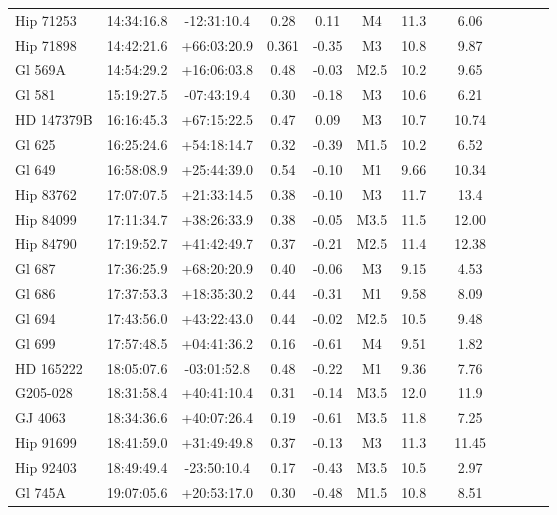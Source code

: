 \begin{landscape}
{\begin{longtable}{l|cccccccccccc}
  Hip 71253 & 14:34:16.8 & -12:31:10.4 & 0.28 & 0.11 & M4 &  11.3 & \citet{Koen10} &  6.06 \\ 
  Hip 71898 & 14:42:21.6 & +66:03:20.9 & 0.361 & -0.35 & M3 & 10.8 & \citet{Hog00} &  9.87  \\ 
  Gl 569A & 14:54:29.2 & +16:06:03.8 & 0.48 & -0.03 & M2.5 & 10.2 & \citet{Koen10} & 9.65  \\
  Gl 581 & 15:19:27.5 & -07:43:19.4 & 0.30 & -0.18 & M3 & 10.6 & \citet{Hog00} & 6.21 \\
   HD 147379B & 16:16:45.3 & +67:15:22.5 & 0.47 & 0.09 & M3 & 10.7 & \citet{Gliese91} & 10.74 \\
     Gl 625 & 16:25:24.6 & +54:18:14.7 & 0.32 & -0.39 & M1.5 & 10.2 & \citet{Hog00} &  6.52  \\ 
  Gl 649 & 16:58:08.9 & +25:44:39.0 & 0.54 & -0.10 & M1 & 9.66 & \citet{Hog00} & 10.34  \\
  Hip 83762 & 17:07:07.5 & +21:33:14.5 & 0.38 & -0.10 & M3 & 11.7 & \citet{Koen10} & 13.4   \\
  Hip 84099 & 17:11:34.7 & +38:26:33.9 & 0.38 & -0.05 & M3.5 & 11.5 & \citet{Hog00} & 12.00   \\ 
  Hip 84790 & 17:19:52.7 & +41:42:49.7 & 0.37 & -0.21 & M2.5 & 11.4 & \citet{Gliese91} & 12.38  \\ 
     Gl 687 & 17:36:25.9 & +68:20:20.9 & 0.40 & -0.06 & M3 & 9.15 & \citet{Hog00} & 4.53  \\
     Gl 686 & 17:37:53.3 & +18:35:30.2 & 0.44 & -0.31 & M1 & 9.58 & \citet{Koen10} & 8.09   \\ 
     Gl 694 & 17:43:56.0 & +43:22:43.0 & 0.44 & -0.02 & M2.5 & 10.5 & \citet{Hog00} &  9.48   \\ 
     Gl 699 & 17:57:48.5 & +04:41:36.2 & 0.16 & -0.61 & M4 & 9.51 & \citet{Koen10} & 1.82   \\ 
   HD 165222 & 18:05:07.6 & -03:01:52.8 & 0.48 & -0.22 & M1 &  9.36 & \citet{Koen10} &  7.76 \\ 
 G205-028 & 18:31:58.4 & +40:41:10.4 & 0.31 & -0.14 & M3.5 & 12.0 & \citet{Gliese91} & 11.9 \\
    GJ 4063 & 18:34:36.6 & +40:07:26.4 & 0.19 & -0.61 & M3.5 & 11.8 & \citet{Hog00} &  7.25    \\ 
  Hip 91699 & 18:41:59.0 & +31:49:49.8 & 0.37 & -0.13 & M3 & 11.3 & \citet{Kharchenko01} & 11.45  \\
  Hip 92403 & 18:49:49.4 & -23:50:10.4 & 0.17 & -0.43 & M3.5 & 10.5 & \citet{Koen10} & 2.97  \\
    Gl 745A & 19:07:05.6 & +20:53:17.0 & 0.30 & -0.48 & M1.5 & 10.8 & \citet{Koen10} &  8.51  \\

\end{longtable}}
\end{landscape}
